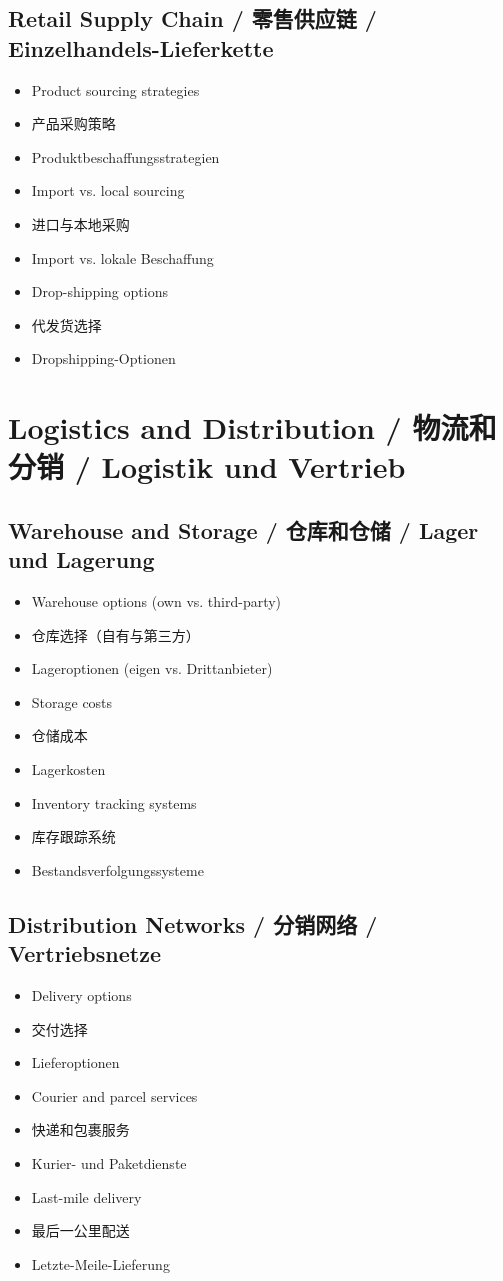 \subsection{Retail Supply Chain / 零售供应链 / Einzelhandels-Lieferkette}
\begin{itemize}
    \item Product sourcing strategies
    \item 产品采购策略
    \item Produktbeschaffungsstrategien
    \item Import vs. local sourcing
    \item 进口与本地采购
    \item Import vs. lokale Beschaffung
    \item Drop-shipping options
    \item 代发货选择
    \item Dropshipping-Optionen
\end{itemize}

\section{Logistics and Distribution / 物流和分销 / Logistik und Vertrieb}

\subsection{Warehouse and Storage / 仓库和仓储 / Lager und Lagerung}
\begin{itemize}
    \item Warehouse options (own vs. third-party)
    \item 仓库选择（自有与第三方）
    \item Lageroptionen (eigen vs. Drittanbieter)
    \item Storage costs
    \item 仓储成本
    \item Lagerkosten
    \item Inventory tracking systems
    \item 库存跟踪系统
    \item Bestandsverfolgungssysteme
\end{itemize}

\subsection{Distribution Networks / 分销网络 / Vertriebsnetze}
\begin{itemize}
    \item Delivery options
    \item 交付选择
    \item Lieferoptionen
    \item Courier and parcel services
    \item 快递和包裹服务
    \item Kurier- und Paketdienste
    \item Last-mile delivery
    \item 最后一公里配送
    \item Letzte-Meile-Lieferung
\end{itemize}

